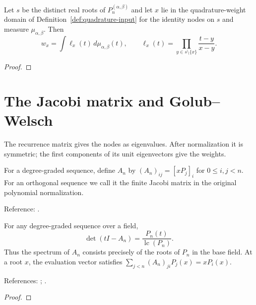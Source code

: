 \begin{supporting}

\begin{theorem}
\label{thm:jacobi-gauss-weight-formula}
\leanok
Let $s$ be the distinct real roots of $P_n^{(\alpha,\beta)}$ and let $x$
lie in the quadrature-weight domain of Definition~\ref{def:quadrature-input}
for the identity nodes on $s$ and measure $\mu_{\alpha,\beta}$. Then
\[
 w_x=\int\ell_x(t)\,d\mu_{\alpha,\beta}(t),\qquad
 \ell_x(t)=\prod_{y\in s\setminus\{x\}}\frac{t-y}{x-y}.
\]
\end{theorem}
\begin{proof}
\leanok
\end{proof}

\end{supporting}

\section{The Jacobi matrix and Golub--Welsch}\label{sec:textbook-gauss-spectrum}

The recurrence matrix gives the nodes as eigenvalues. After normalization it is symmetric; the first components of its unit eigenvectors give the weights.

\begin{definition}
\label{def:finite-jacobi-matrix}
\leanok
For a degree-graded sequence, define $A_n$ by $(A_n)_{ij}=[xP_j]_i$ for
$0\le i,j<n$. For an orthogonal sequence we call it the finite Jacobi matrix
in the original polynomial normalization.

Reference: \cite[3.5(vi)]{dlmf}.
\end{definition}

\begin{theorem}
\label{thm:finite-jacobi-charpoly}
\leanok
For any degree-graded sequence over a field,
\[
 \det(tI-A_n)=\frac{P_n(t)}{\operatorname{lc}(P_n)}.
\]
Thus the spectrum of $A_n$ consists precisely of the roots of $P_n$ in the
base field. At a root $x$, the evaluation vector satisfies
$\sum_{j<n}(A_n)_{ji}P_j(x)=xP_i(x)$.

References: \cite[3.5(vi)]{dlmf}; \cite[Chapter 18]{atap}.
\end{theorem}
\begin{proof}
\leanok
\end{proof}

